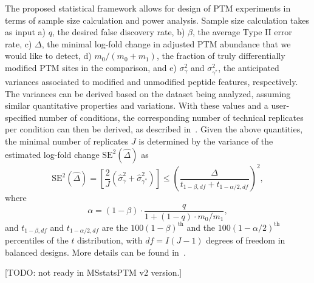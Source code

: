 \documentclass{mcp}
\def\todo#1{{\color{red}[TODO: #1]}}
\begin{document}
The proposed statistical framework allows for design of PTM experiments in terms of sample size calculation and power analysis. 
Sample size calculation takes as input a) $q$, the desired false discovery rate, b) $\beta$, the average Type II error rate, c) $\Delta$, the minimal log-fold change in adjusted PTM abundance that we would like to detect, d) $m_0 / (m_0 + m_1)$, the fraction of truly differentially modified PTM sites in the comparison, and e) $\sigma_{\gamma}^{2}$ and $\sigma_{\gamma^{\ast}}^{2}$, the anticipated variances associated to modified and unmodified peptide features, respectively. The variances can be derived based on the dataset being analyzed, assuming similar quantitative properties and variations. With these values and a user-specified number of conditions, the corresponding number of technical replicates per condition can then be derived, as described in~\cite{kutner_etal_04a}. Given the above quantities, the minimal number of replicates $J$ is determined by the variance of the estimated log-fold change $\mathrm{SE}^{2}(\hat{\Delta})$ as
\[
\mathrm{SE}^{2}(\hat{\Delta}) = \left[ \frac{2}{J} \left( \hat{\sigma}_{\gamma}^{2} + \hat{\sigma}_{\gamma^{\ast}}^{2} \right) \right]
\leq \left( \frac{\Delta}{t_{1-\beta, df} + t_{1-\alpha /2, df}} \right)^{2},
\]
where 
\[
\alpha = (1 - \beta) \cdot \frac{q}{1 + (1-q) \cdot m_0 / m_1},
\]
and $t_{1-\beta, df}$ and $t_{1-\alpha /2, df}$ are the $100(1-\beta)^{\text{th}}$ and the $100(1-\alpha /2)^{\text{th}}$ percentiles of the $t$ distribution, with $df = I(J-1)$ degrees of freedom in balanced designs. More details can be found in~\cite{oberg_vitek_09a}. 

\todo{not ready in MSstatsPTM v2 version.}
\end{document}
